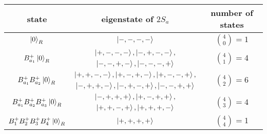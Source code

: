 \begin{tabular}{|c|c|c|} \hline
    state & eigenstate of $2S_a$ & number of states \\ \hline
    $\ket{0}_{R}$ & $\ket{-,-,-,-}$ & $\binom{4}{0} = 1$ \\ \hline
    \multirow{2}{*}{$B^+_{a_1} \ket{0}_{R}$} & $\ket{+,-,-,-}, \ket{-,+,-,-},$ & \multirow{2}{*}{$\binom{4}{1} = 4$} \\ 
    & $\ket{-,-,+,-}, \ket{-,-,-,+}$ & \\ \hline
    \multirow{2}{*}{$B^+_{a_1}B^+_{a_2}\ket{0}_{R}$} & $\ket{+,+,-,-}, \ket{+,-,+,-}, \ket{+,-,-,+},$ & \multirow{2}{*}{$\binom{4}{2} = 6$} \\ 
    & $\ket{-,+,+,-}, \ket{-,+,-,+}, \ket{-,-,+,+}$ & \\ \hline
    \multirow{2}{*}{$B^+_{a_1}B^+_{a_2}B^+_{a_3} \ket{0}_{R}$} & $\ket{-,+,+,+}, \ket{+,-,+,+},$ & \multirow{2}{*}{$\binom{4}{3} = 4$} \\ 
    & $\ket{+,+,-,+}, \ket{+,+,+,-}$ & \\ \hline
    $B^+_{1}B^+_{2}B^+_{3}B^+_{4} \ket{0}_{R}$ & $\ket{+,+,+,+}$ & $\binom{4}{4} = 1$ \\ \hline
\end{tabular}